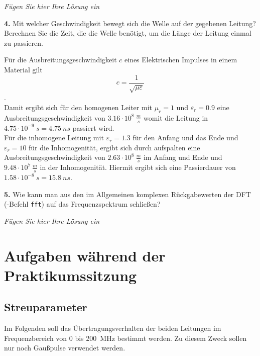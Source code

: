 \documentclass[Protokollheft.tex]{subfiles}
\begin{document}
\emph{Fügen Sie hier Ihre Lösung ein}

\begin{framed}
	\noindent \textbf{4.} Mit welcher Geschwindigkeit bewegt sich die Welle auf der gegebenen Leitung? Berechnen Sie die Zeit, die die Welle benötigt, um die Länge der Leitung einmal zu passieren.\label{exer:calcSpeedTime}
\end{framed}

Für die Ausbreitungsgeschwindigkeit $c$ eines Elektrischen Impulses in einem Material gilt 
\begin{equation}
 \label{eq:cSpeed}
 c = \frac{1}{\sqrt{\mu \varepsilon}}
\end{equation}.\\
Damit ergibt sich für den homogenen Leiter mit $\mu_r = 1$ und $\varepsilon_r = 0.9$ eine Ausbreitungsgeschwindigkeit von $3.16 \cdot 10^8 \ \si{ \frac{m}{s}}$ womit die Leitung in $4.75\cdot 10^{-9} \  \si{ s} = 4.75 \  \si{ ns}$ passiert wird. \\
Für die inhomogene Leitung mit $\varepsilon_r = 1.3$ für den Anfang und das Ende und $\varepsilon_r = 10$ für die Inhomogenität, ergibt sich durch aufspalten eine Ausbreitungsgeschwindigkeit von $2.63\cdot 10^8 \ \si{\frac{m}{s}}$ im Anfang und Ende und $ 9.48 \cdot 10^7 \ \si{\frac{m}{s}}$ in der Inhomogenität. Hiermit ergibt sich eine Passierdauer von $1.58\cdot 10^{-8} \ \si{s} = 15.8 \ \si{ns}$.

\begin{framed}
	\noindent \textbf{5.} Wie kann man aus den im Allgemeinen komplexen Rückgabewerten der DFT (\matlab-Befehl \verb"fft") auf das Frequenzspektrum schließen?\label{exer:freqSpectByDFT}
\end{framed}

\emph{Fügen Sie hier Ihre Lösung ein}

\section{Aufgaben während der Praktikumssitzung}

{\subsection{Streuparameter}}

\noindent
Im Folgenden soll das Übertragungsverhalten der beiden Leitungen
im Frequenzbereich von $0$ bis \SI{200}{MHz} bestimmt werden. Zu diesem
Zweck sollen nur noch Gaußpulse verwendet werden.
\end{document}
